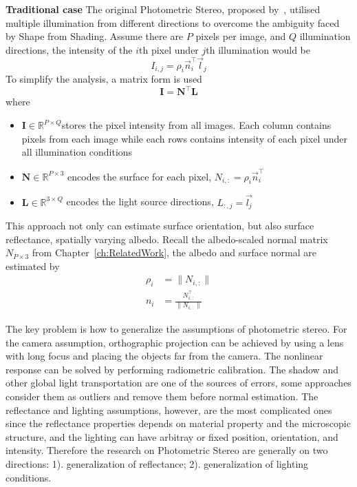 \textbf{Traditional case} 
The original Photometric Stereo, proposed by~\citeauthor{woodham1980photometric}, utilised multiple illumination from different directions to overcome the ambiguity faced by Shape from Shading. Assume there are $P$ pixels per image, and $Q$ illumination directions, the intensity of the $i$th pixel under $j$th illumination would be
$$
I_{i,j}=\rho_i\vec{n}_i^\top \vec{l}_j
$$
To simplify the analysis, a matrix form is used
$$
\mathbf{I} = \mathbf{N}^\top \mathbf{L}
$$
where
\begin{itemize}
\item $\mathbf{I}\in \mathbb{R}^{P\times Q} $stores the pixel intensity from all images. Each column contains pixels from each image while each rows contains intensity of each pixel under all illumination conditions
\item $\mathbf{N}\in \mathbb{R}^{P\times3}$ encodes the surface for each pixel, \ie $N_{i, :} = \rho_i\vec{n}_i^\top$
\item $\mathbf{L} \in \mathbb{R}^{3\times Q}$ encodes the light source directions, \ie $L_{:, j} = \vec{l_j}$
\end{itemize}
This approach not only can estimate surface orientation, but also surface reflectance, \ie spatially varying albedo. Recall the albedo-scaled normal matrix $N_{P\times 3}$ from Chapter~\ref{ch:RelatedWork}, the albedo and surface normal are estimated by
\begin{align*}
\rho_i &= \|N_{i,:}\|\\
n_i &= \frac{N_{i,:}^\top}{\|N_{i,:}\|}
\end{align*}

The key problem is how to generalize the assumptions of photometric stereo. For the camera assumption, orthographic projection can be achieved by using a lens with long focus and placing the objects far from the camera. The nonlinear response can be solved by performing radiometric calibration. The shadow and other global light transportation are one of the sources of errors, some approaches consider them as outliers and remove them before normal estimation. The reflectance and lighting assumptions, however, are the most complicated ones since the reflectance properties depends on material property and the microscopic structure, and the lighting can have arbitray or fixed position, orientation, and intensity. Therefore the research on Photometric Stereo are generally on two directions: 1). generalization of reflectance; 2). generalization of lighting conditions.


